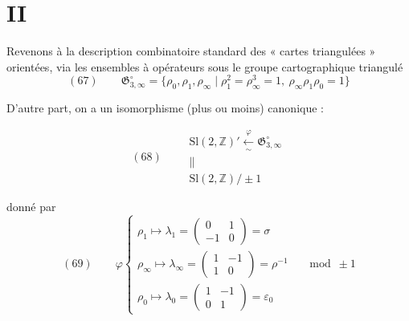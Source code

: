 \documentclass[11pt,a4paper]{article}
\begin{document}
\section*{II}

Revenons à la description combinatoire standard des « cartes triangulées » orientées, via les ensembles à opérateurs sous le groupe cartographique  triangulé
\[
(67)\qquad \mathfrak{G}^{\circ}_{3,\infty} = \{\rho_0, \rho_1, \rho_\infty \mid \rho_1^2 = \rho_\infty^3 = 1, \ \rho_\infty \rho_1 \rho_0 = 1\}
\]

D'autre part, on a un isomorphisme (plus ou moins) canonique :

\[
(68)\qquad
\begin{array}{c}
\mathrm{Sl}(2,\mathbb{Z})' \xleftarrow[\ \sim\ ]{\ \varphi\ } \mathfrak{G}^{\circ}_{3,\infty} \\
\| \\
\mathrm{Sl}(2,\mathbb{Z})/\pm 1
\end{array}
\]

donné par
\[
(69)\qquad \varphi
\begin{cases}
\rho_1 \longmapsto \lambda_1 = \begin{pmatrix} 0 & 1 \\ -1 & 0 \end{pmatrix} = \sigma \\[4pt]
\rho_\infty \longmapsto \lambda_\infty = \begin{pmatrix} 1 & -1 \\ 1 & 0 \end{pmatrix} = \rho^{-1} \\[4pt]
\rho_0 \longmapsto \lambda_0 = \begin{pmatrix} 1 & -1 \\ 0 & 1 \end{pmatrix} = \varepsilon_0
\end{cases}
\quad \bmod \pm 1
\]
\end{document}
